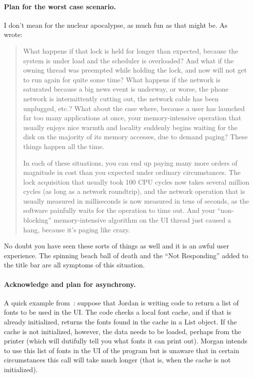 \documentclass[a4paper]{report}
\begin{document}
\paragraph{Plan for the worst case scenario.} I don't mean for the nuclear apocalypse, as much fun as that might be. As~\cite{preopt} wrote:

\begin{quote}
What happens if that lock is held for longer than expected, because the system is under load and the scheduler is overloaded? And what if the owning thread was preempted while holding the lock, and now will not get to run again for quite some time? What happens if the network is saturated because a big news event is underway, or worse, the phone network is intermittently cutting out, the network cable has been unplugged, etc.? What about the case where, because a user has launched far too many applications at once, your memory-intensive operation that usually enjoys nice warmth and locality suddenly begins waiting for the disk on the majority of its memory accesses, due to demand paging? These things happen all the time.

In each of these situations, you can end up paying many more orders of magnitude in cost than you expected under ordinary circumstances. The lock acquisition that usually took 100 CPU cycles now takes several million cycles (as long as a network roundtrip), and the network operation that is usually measured in milliseconds is now measured in tens of seconds, as the software painfully waits for the operation to time out. And your ``non-blocking'' memory-intensive algorithm on the UI thread just caused a hang, because it's paging like crazy.
\end{quote}

No doubt you have seen these sorts of things as well and it is an awful user experience. The spinning beach ball of death and the ``Not Responding'' added to the title bar are all symptoms of this situation. 

\paragraph{Acknowledge and plan for asynchrony.} A quick example from~\cite{preopt}: suppose that Jordan is writing code to return a list of fonts to be used in the UI. The code checks a local font cache, and if that is already initialized, returns the fonts found in the cache in a List object. If the cache is not initialized, however, the data needs to be loaded, perhaps from the printer (which will dutifully tell you what fonts it can print out). Morgan intends to use this list of fonts in the UI of the program but is unaware that in certain circumstances this call will take much longer (that is, when the cache is not initialized).
\end{document}
